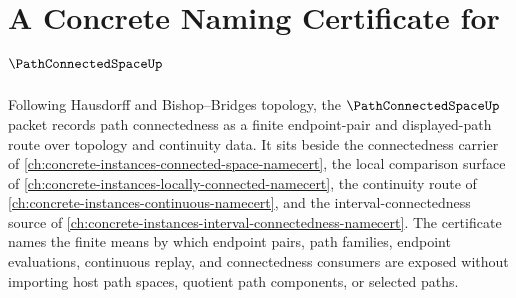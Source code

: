 \chapter{A Concrete Naming Certificate for $\PathConnectedSpaceUp$}
\label{ch:concrete-instances-path-connected-space-namecert}

Following Hausdorff and Bishop--Bridges topology, the $\PathConnectedSpaceUp$ packet records path connectedness as a finite endpoint-pair and displayed-path route over topology and continuity data. It sits beside the connectedness carrier of \autoref{ch:concrete-instances-connected-space-namecert}, the local comparison surface of \autoref{ch:concrete-instances-locally-connected-namecert}, the continuity route of \autoref{ch:concrete-instances-continuous-namecert}, and the interval-connectedness source of \autoref{ch:concrete-instances-interval-connectedness-namecert}. The certificate names the finite means by which endpoint pairs, path families, endpoint evaluations, continuous replay, and connectedness consumers are exposed without importing host path spaces, quotient path components, or selected paths.

